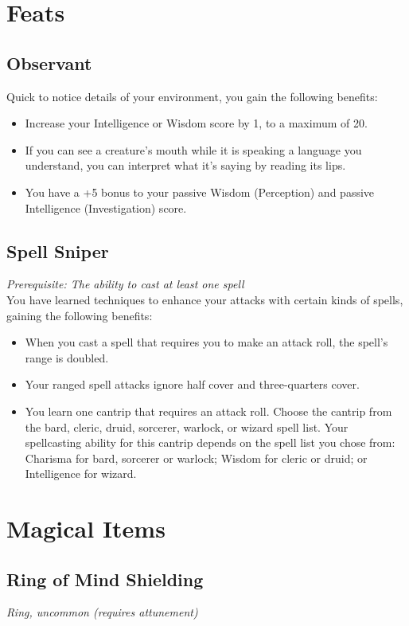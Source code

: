 \documentclass[letterpaper,openany,oneside,twocolumn]{book}
\begin{document}
\section*{Feats}
\subsection*{Observant}
Quick to notice details of your environment, you gain the following benefits:
\begin{itemize}
  \item Increase your Intelligence or Wisdom score by 1, to a maximum of 20.
  \item If you can see a creature's mouth while it is speaking a language you understand, you can interpret what it's saying by reading its lips.
  \item You have a +5 bonus to your passive Wisdom (Perception) and passive Intelligence (Investigation) score.
\end{itemize}

\subsection*{Spell Sniper}
\textit{Prerequisite: The ability to cast at least one spell}\\
You have learned techniques to enhance your attacks with certain kinds of spells, gaining the following benefits:
\begin{itemize}
  \item When you cast a spell that requires you to make an attack roll, the spell's range is doubled.
  \item Your ranged spell attacks ignore half cover and three-quarters cover.
  \item You learn one cantrip that requires an attack roll. Choose the cantrip from the bard, cleric, druid, sorcerer, warlock, or wizard spell list. Your spellcasting ability for this cantrip depends on the spell list you chose from: Charisma for bard, sorcerer or warlock; Wisdom for cleric or druid; or Intelligence for wizard.
\end{itemize}

\section*{Magical Items}
\subsection*{Ring of Mind Shielding}
\textit{Ring, uncommon (requires attunement)}
\end{document}
